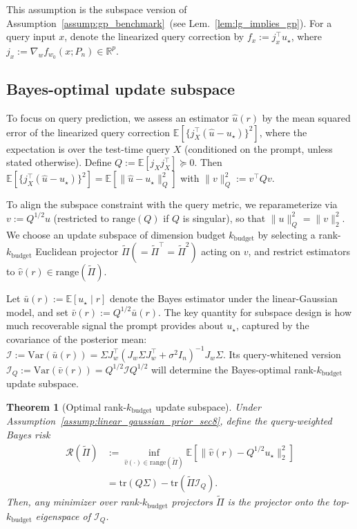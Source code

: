 \documentclass{article}
\theoremstyle{plain}
\newtheorem{theorem}{Theorem}[section]
\theoremstyle{definition}
\theoremstyle{remark}
\begin{document}
This assumption is the subspace version of Assumption~\ref{assump:gp_benchmark}~(see Lem.~\ref{lem:lg_implies_gp}). For a query input $x$, denote the linearized query correction by $f_x:= j_x^\top u_\star$, where $j_x:=\nabla_w f_{w_0}(x;P_n)\in\mathbb{R}^p$.

\subsection{Bayes-optimal update subspace}\label{subsec:optimal_subspace_sec8}

To focus on query prediction, we assess an estimator $\widehat u(r)$ by the mean squared error of the linearized query correction $\mathbb{E}\!\left[\{j_X^\top(\widehat u-u_\star)\}^2\right]$, where the expectation is over the test-time query $X$ (conditioned on the prompt, unless stated otherwise). Define $Q:=\mathbb{E}\!\left[j_X j_X^\top\right]\succeq 0 $. Then $\mathbb{E}[\{j_X^\top(\widehat u-u_\star)\}^2]=\mathbb{E}[\|\widehat u-u_\star\|_Q^2]$ with $\|v\|_Q^2:=v^\top Qv$.

To align the subspace constraint with the query metric, we reparameterize via $v:=Q^{1/2}u$ (restricted to $\mathrm{range}(Q)$ if $Q$ is singular), so that $\|u\|_Q^2=\|v\|_2^2$. We choose an update subspace of dimension budget $k_{\text{budget}}$ by selecting a rank-$k_{\text{budget}}$ Euclidean projector $\widetilde\Pi(=\widetilde\Pi^\top=\widetilde\Pi^2)$ acting on $v$, and restrict estimators to $\widehat v(r)\in\mathrm{range}(\widetilde\Pi)$.

Let $\bar u(r):=\mathbb{E}[u_\star\mid r]$ denote the Bayes estimator under the linear-Gaussian model, and
set $\bar v(r):=Q^{1/2}\bar u(r)$. The key quantity for subspace design is how much recoverable signal the prompt provides about $u_\star$, captured by the covariance of the posterior mean: $\mathcal{I}:=\mathrm{Var}(\bar u(r))
=\Sigma J_w^\top(J_w\Sigma J_w^\top+\sigma^2 I_n)^{-1}J_w\Sigma.$ Its query-whitened version $\mathcal I_Q:=\mathrm{Var}(\bar v(r))=Q^{1/2}\mathcal I Q^{1/2}$ will determine the Bayes-optimal rank-$k_{\text{budget}}$ update subspace.

\begin{theorem}[Optimal rank-$k_{\text{budget}}$ update subspace]\label{thm:optimal_subspace_sec8}
Under Assumption~\ref{assump:linear_gaussian_prior_sec8}, define the query-weighted Bayes risk 
\begin{align*}
    \mathcal R(\widetilde\Pi) 
    &:=\inf_{\widehat v(\cdot)\in\mathrm{range}(\widetilde\Pi)} \mathbb{E}\!\left[\|\widehat v(r)-Q^{1/2}u_\star\|_2^2\right] \\
    &= \mathrm{tr}(Q\Sigma) - \mathrm{tr}(\widetilde\Pi\mathcal I_Q) .
\end{align*}
Then, any minimizer over rank-$k_{\text{budget}}$ projectors $\widetilde\Pi$ is the projector onto the top-$k_{\text{budget}}$ eigenspace of $\mathcal I_Q$.
\end{theorem}
\end{document}
